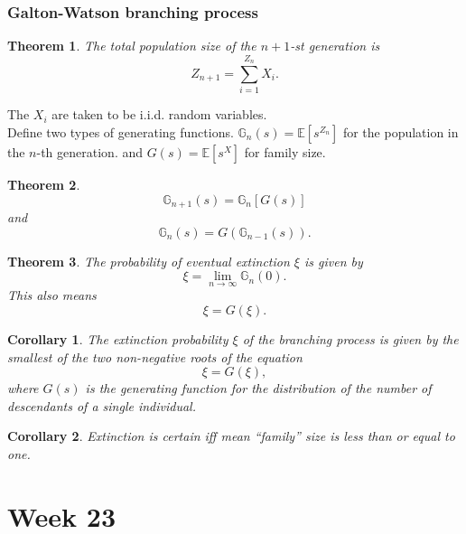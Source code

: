 \documentclass{article}
\newtheorem{theorem}{Theorem}
\newtheorem{corollary}{Corollary}
\newcommand{\E}{\mathbb{E}}
\begin{document}
\subsubsection{Galton-Watson branching process}
\begin{theorem}
    The total population size of the $n+1$-st generation is
    \begin{equation}
        Z_{n+1} = \sum_{i=1}^{Z_n} X_i.
    \end{equation}
\end{theorem}
The $X_i$ are taken to be i.i.d. random variables. \\
Define two types of generating functions. $\mathbb{G}_n(s) = \E[s^{Z_n}]$ for the population in the $n$-th generation. and $G(s) = \E[s^X]$ for family size.
\begin{theorem}
    \begin{equation}
        \mathbb{G}_{n+1}(s) = \mathbb{G}_n[G(s)]
    \end{equation}
    and
    \begin{equation}
        \mathbb{G}_{n}(s) = G(\mathbb{G}_{n-1}(s)).
    \end{equation}
\end{theorem}
\begin{theorem}
    The probability of eventual extinction $\xi$ is given by
    \begin{equation}
        \xi = \lim_{n\to\infty} \mathbb{G}_n(0).
    \end{equation}
    This also means
    \begin{equation}
        \xi = G(\xi).
    \end{equation}
\end{theorem}
\begin{corollary}
    The extinction probability $\xi$ of the branching process is given by the smallest of the two non-negative roots of the equation
    \begin{equation}
        \xi = G(\xi), \nonumber    
    \end{equation}
    where $G(s)$ is the generating function for the distribution of the number of descendants of a single individual.
\end{corollary}
\begin{corollary}
    Extinction is certain iff mean ``family'' size is less than or equal to one.
\end{corollary}



\section{Week 23}
\end{document}
